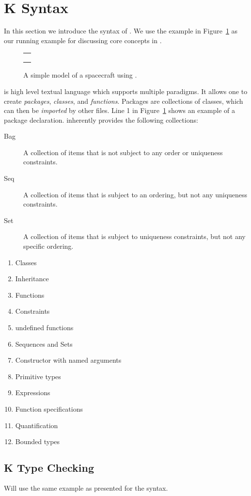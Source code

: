 \section{K Syntax}

In this section we introduce the syntax of \Klang{}. We use the
\Klang{} example in Figure~\ref{fig:fs} as our running example for
discussing core concepts in \Klang{}.

\begin{figure}
\centering
\begin{tabular}{c}
\hline \\
 \\ \\
\hline
\end{tabular}
\caption{A simple model of a spacecraft using \Klang{}.}
\label{fig:fs}
\end{figure}

\Klang{} is high level textual language which supports multiple
paradigms. It allows one to create {\em packages}, {\em classes}, and
{\em functions}. Packages are collections of classes, which can then
be {\em imported} by other \Klang{} files. Line 1 in
Figure~\ref{fig:fs} shows an example of a package
declaration. \Klang{} inherently provides the following collections:

\begin{description}
\item [Bag] A collection of items that is not subject to any order
  or uniqueness constraints.
\item [Seq] A collection of items that is subject to an ordering, but
  not any uniqueness constraints.
\item [Set] A collection of items that is subject to uniqueness
  constraints, but not any specific ordering.
\end{description}





\begin{enumerate}
\item Classes
\item Inheritance
\item Functions
\item Constraints
\item undefined functions
\item Sequences and Sets
\item Constructor with named arguments
\item Primitive types
\item Expressions
\item Function specifications
\item Quantification
\item Bounded types
\end{enumerate}

\subsection{K Type Checking}

Will use the same example as presented for the syntax.
